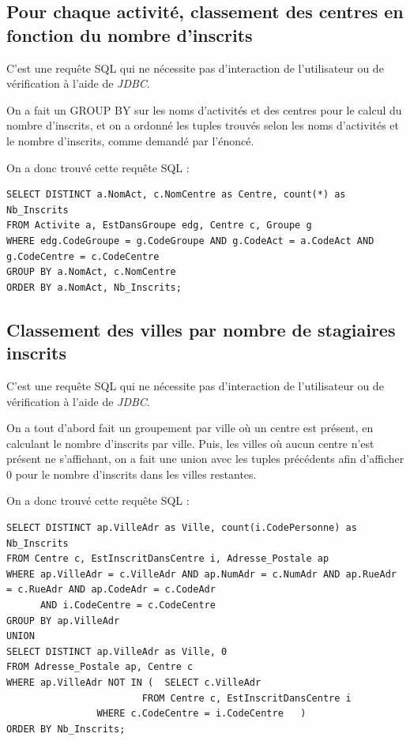 \documentclass[10pt]{article}
\begin{document}
\subsection{Pour chaque activité, classement des centres en fonction du nombre d'inscrits}

C'est une requête SQL qui ne nécessite pas d'interaction de l'utilisateur ou de vérification à l'aide de \emph{JDBC}. 

On a fait un GROUP BY sur les noms d'activités et des centres pour le calcul du nombre d'inscrits, et on a ordonné les tuples trouvés 
selon les noms d'activités et le nombre d'inscrits, comme demandé par l'énoncé.

On a donc trouvé cette requête SQL :

\begin{small}
\begin{verbatim}
SELECT DISTINCT a.NomAct, c.NomCentre as Centre, count(*) as Nb_Inscrits
FROM Activite a, EstDansGroupe edg, Centre c, Groupe g
WHERE edg.CodeGroupe = g.CodeGroupe AND g.CodeAct = a.CodeAct AND g.CodeCentre = c.CodeCentre
GROUP BY a.NomAct, c.NomCentre
ORDER BY a.NomAct, Nb_Inscrits;
\end{verbatim}
\end{small}

\subsection{Classement des villes par nombre de stagiaires inscrits}

C'est une requête SQL qui ne nécessite pas d'interaction de l'utilisateur ou de vérification à l'aide de \emph{JDBC}. 

On a tout d'abord fait un groupement par ville où un centre est présent, en calculant le nombre d'inscrits par ville.
Puis, les villes où aucun centre n'est présent ne s'affichant, on a fait une union avec les tuples précédents afin d'afficher $0$ 
pour le nombre d'inscrits dans les villes restantes.

On a donc trouvé cette requête SQL :

\begin{small}
\begin{verbatim}
SELECT DISTINCT ap.VilleAdr as Ville, count(i.CodePersonne) as Nb_Inscrits
FROM Centre c, EstInscritDansCentre i, Adresse_Postale ap
WHERE ap.VilleAdr = c.VilleAdr AND ap.NumAdr = c.NumAdr AND ap.RueAdr = c.RueAdr AND ap.CodeAdr = c.CodeAdr 
      AND i.CodeCentre = c.CodeCentre
GROUP BY ap.VilleAdr
UNION
SELECT DISTINCT ap.VilleAdr as Ville, 0
FROM Adresse_Postale ap, Centre c
WHERE ap.VilleAdr NOT IN (	SELECT c.VilleAdr
      		      	 	FROM Centre c, EstInscritDansCentre i
				WHERE c.CodeCentre = i.CodeCentre	)
ORDER BY Nb_Inscrits;
\end{verbatim}
\end{small}
\end{document}
